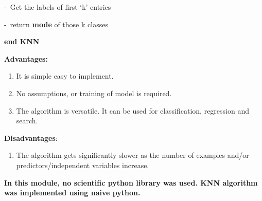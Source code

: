 \documentclass[12pt]{article}
\renewcommand{\_}{\kern-1.5pt\textunderscore\kern-1.5pt}
\begin{document}
\begin{enumerate}
\begin{FlushLeft}
\tab \tab -\  Get the labels of first ‘k’ entries
\end{FlushLeft}\par

\begin{FlushLeft}
-\  return \textbf{mode} of those k classes
\end{FlushLeft}\par

\begin{FlushLeft}
\textbf{end KNN}
\end{FlushLeft}\par

\begin{FlushLeft}
\textbf{Advantages:}
\end{FlushLeft}\par

\begin{enumerate}
	\item It is simple easy to implement.\par

	\item No assumptions, or training of model is required.\par

	\item The algorithm is versatile. It can be used for classification, regression and search.
\end{enumerate}\par

\begin{FlushLeft}
\textbf{Disadvantages}:
\end{FlushLeft}\par

\begin{enumerate}
	\item The algorithm gets significantly slower as the number of examples and/or predictors/independent variables increase.
\end{enumerate}\par

\begin{FlushLeft}
\textbf{In this module, no scientific python library was used. KNN algorithm was implemented using naive python.}
\end{FlushLeft}\par


\vspace{\baselineskip}


\end{enumerate}
\end{document}
